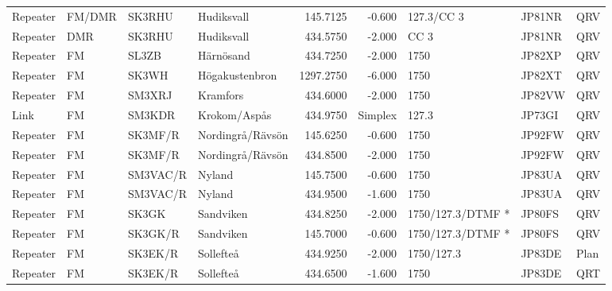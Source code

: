 \begin{landscape}
\begin{longtable}{llllrrlll}
	Repeater          & FM/DMR          & SK3RHU   & Hudiksvall          &     145.7125 &     -0.600 & 127.3/CC 3         & JP81NR      & QRV      \\
	Repeater          & DMR             & SK3RHU   & Hudiksvall          &     434.5750 &     -2.000 & CC 3               & JP81NR      & QRV      \\
	Repeater          & FM              & SL3ZB    & Härnösand           &     434.7250 &     -2.000 & 1750               & JP82XP      & QRV      \\
	Repeater          & FM              & SK3WH    & Högakustenbron      &    1297.2750 &     -6.000 & 1750               & JP82XT      & QRV      \\
	Repeater          & FM              & SM3XRJ   & Kramfors            &     434.6000 &     -2.000 & 1750               & JP82VW      & QRV      \\
	Link              & FM              & SM3KDR   & Krokom/Aspås        &     434.9750 &    Simplex & 127.3              & JP73GI      & QRV      \\
	Repeater          & FM              & SK3MF/R  & Nordingrå/Rävsön    &     145.6250 &     -0.600 & 1750               & JP92FW      & QRV      \\
	Repeater          & FM              & SK3MF/R  & Nordingrå/Rävsön    &     434.8500 &     -2.000 & 1750               & JP92FW      & QRV      \\
	Repeater          & FM              & SM3VAC/R & Nyland              &     145.7500 &     -0.600 & 1750               & JP83UA      & QRV      \\
	Repeater          & FM              & SM3VAC/R & Nyland              &     434.9500 &     -1.600 & 1750               & JP83UA      & QRV      \\
	Repeater          & FM              & SK3GK    & Sandviken           &     434.8250 &     -2.000 & 1750/127.3/DTMF *  & JP80FS      & QRV      \\
	Repeater          & FM              & SK3GK/R  & Sandviken           &     145.7000 &     -0.600 & 1750/127.3/DTMF *  & JP80FS      & QRV      \\
	Repeater          & FM              & SK3EK/R  & Sollefteå           &     434.9250 &     -2.000 & 1750/127.3         & JP83DE      & Plan     \\
	Repeater          & FM              & SK3EK/R  & Sollefteå           &     434.6500 &     -1.600 & 1750               & JP83DE      & QRT      \\

\end{longtable}
\end{landscape}
